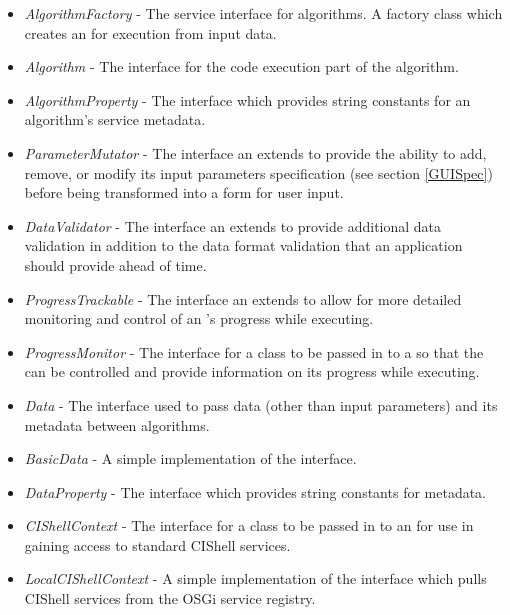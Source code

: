 \begin{itemize}
  \item \textit{AlgorithmFactory} - The service interface for algorithms.
  A factory class which creates an  for execution from input
  data.
  \item \textit{Algorithm} - The interface for the code execution part of the
  algorithm.
  \item \textit{AlgorithmProperty} - The interface which provides string
  constants for an algorithm's service metadata.
  \item \textit{ParameterMutator} - The interface an 
  extends to provide the ability to add, remove, or modify its input
  parameters specification (see section \ref{GUISpec}) before being transformed
  into a form for user input.
  \item \textit{DataValidator} - The interface an 
  extends to provide additional data validation in addition to the data format validation
  that an application should provide ahead of time.
  \item \textit{ProgressTrackable} - The interface an  extends
  to allow for more detailed monitoring and control of an 's
  progress while executing.
  \item \textit{ProgressMonitor} - The interface for a class to be passed in to
  a   so that the 
  can be controlled and provide information on its progress while executing.
  \item \textit{Data} - The interface used to pass data (other than
  input parameters) and its metadata between algorithms.
  \item \textit{BasicData} - A simple implementation of the 
  interface.
  \item \textit{DataProperty} - The interface which provides string constants
  for  metadata.
  \item \textit{CIShellContext} - The interface for a class to be passed in to
  an  for use in gaining access to standard CIShell
  services.
  \item \textit{LocalCIShellContext} - A simple implementation of the
   interface which pulls CIShell services from the OSGi
  service registry.
\end{itemize}

